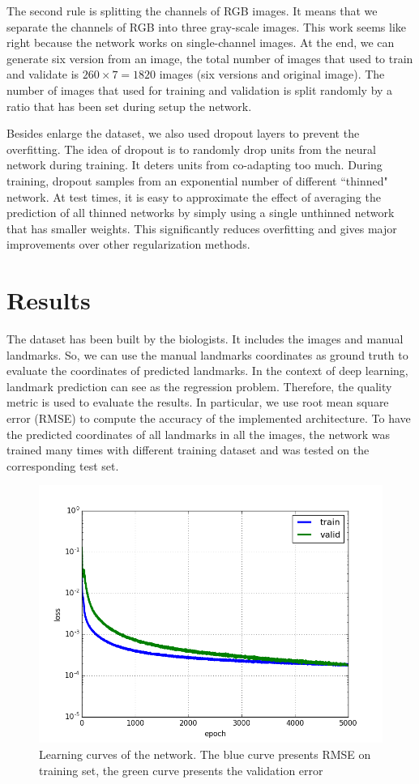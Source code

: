 \documentclass[conference]{IEEEtran}
\begin{document}
The second rule is splitting the channels of RGB images. It means that we separate the channels of RGB into three gray-scale images. This work seems like right because the network works on single-channel images. At the end, we can generate six version from an image, the total number of images that used to train and validate is $260 \times 7 = 1820$ images (six versions and original image). The number of images that used for training and validation is split randomly by a ratio that has been set during setup the network.

Besides enlarge the dataset, we also used dropout layers to prevent the overfitting. The idea of dropout is to randomly drop units from the neural network during training. It deters units from co-adapting too much. During training, dropout samples from an exponential number of different ``thinned" network. At test times, it is easy to approximate the effect of averaging the prediction of all thinned networks by simply using a single unthinned network that has smaller weights. This significantly reduces overfitting and gives major improvements over other regularization methods\cite{srivastava2014dropout}.
\section{Results}
The dataset has been built by the biologists. It includes the images and manual landmarks. So, we can use the manual landmarks coordinates as ground truth to evaluate the coordinates of predicted landmarks. In the context of deep learning, landmark prediction can see as the regression problem. Therefore, the quality metric is used to evaluate the results. In particular, we use root mean square error (RMSE) to compute the accuracy of the implemented architecture. To have the predicted coordinates of all landmarks in all the images, the network was trained many times with different training dataset and was tested on the corresponding test set.

\begin{figure}[htbp]
	\centerline{\includegraphics[scale=0.35]{images/loss_v16}}
	\caption{Learning curves of the network. The blue curve presents RMSE on training set, the green curve presents the validation error}
	\label{figloss}
\end{figure}
\end{document}

